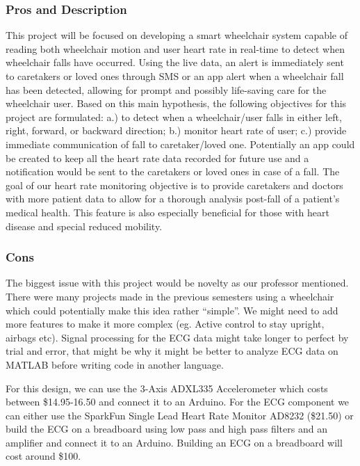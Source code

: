\documentclass[11pt]{article}
\begin{document}
\subsubsection{Pros and Description}
\label{sec:orgbfb8ae4}
This project will be focused on developing a smart wheelchair system capable of reading both wheelchair motion and user heart rate in real-time to detect when wheelchair falls have occurred. Using the live data, an alert is immediately sent to caretakers or loved ones through SMS or an app alert when a wheelchair fall has been detected, allowing for prompt and possibly life-saving care for the wheelchair user. Based on this main hypothesis, the following objectives for this project are formulated: a.) to detect when a wheelchair/user falls in either left, right, forward, or backward direction; b.) monitor heart rate of user; c.) provide immediate communication of fall to caretaker/loved one. Potentially an app could be created to keep all the heart rate data recorded for future use and a notification would be sent to the caretakers or loved ones in case of a fall. The goal of our heart rate monitoring objective is to provide caretakers and doctors with more patient data to allow for a thorough analysis post-fall of a patient’s medical health. This feature is also especially beneficial for those with heart disease and special reduced mobility.

\subsubsection{Cons}
\label{sec:org3400c16}
The biggest issue with this project would be novelty as our professor mentioned. There were many projects made in the previous semesters using a wheelchair which could potentially make this idea rather “simple”. We might need to add more features to make it more complex (eg. Active control to stay upright, airbags etc). Signal processing for the ECG data might take longer to perfect by trial and error, that might be why it might be better to analyze ECG data on MATLAB before writing code in another language.

For this design, we can use the 3-Axis ADXL335 Accelerometer which costs between \$14.95-16.50 and connect it to an Arduino. For the ECG component we can either use the SparkFun Single Lead Heart Rate Monitor AD8232 (\$21.50) or build the ECG on a breadboard using low pass and high pass filters and an amplifier and connect it to an Arduino. Building an ECG on a breadboard will cost around \$100.
\end{document}
